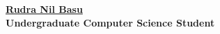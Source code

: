 \documentclass[11pt]{article}
\begin{document}
\begin{center}
    \hspace{-\hoffset}
    \huge\bf{\href{http://rudranilbasu.github.io/}{Rudra Nil Basu}}\\
    \small{Undergraduate Computer Science Student}
\end{center}
\end{document}
